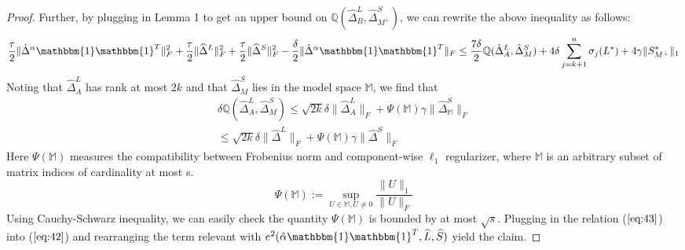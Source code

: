 \documentclass[AMS,STIX1COL]{WileyNJD-v2}
\begin{document}
\begin{proof}
Further, by plugging in Lemma 1 to get an upper bound on  $\mathbb{Q}(\widehat{\Delta}^L_{B},\widehat{\Delta}^S_{M^\perp})$, we can rewrite the above inequality as follows:
\begin{align}
    \frac{\tau}{2} \|\hat{\Delta}^{\alpha}\mathbbm{1}\mathbbm{1}^T\|_{F}^{2} + \frac{\tau}{2} \|\widehat{\Delta}^{L}\|_{F}^{2} + \frac{\tau}{2} \|\widehat{\Delta}^{S}\|_{F}^{2} -
    \frac{\delta}{2} \|\hat{\Delta}^{\alpha}\mathbbm{1}\mathbbm{1}^T\|_{F} 
    \leq 
    \frac{7\delta}{2}\mathbb{Q}(\hat{\Delta}^L_{A},\hat{\Delta}^S_{M}) + 4 \delta \sum_{j=k+1}^{n} \sigma_{j}(L^*) + 4\gamma \|S^*_{M^\perp}\|_{1}  \label{eq:42}
\end{align}
Noting that $\widehat{\Delta}^{L}_{A}$ has rank at most 2$k$ and that $\widehat{\Delta}^{S}_{M}$ lies in the model space $\mathbb{M}$, we find that
\begin{align}
    \nonumber 
    \delta\mathbb{Q}(\widehat{\Delta}^L_{A},\widehat{\Delta}^S_{M}) 
    \leq \sqrt{2k}\delta\|\widehat{\Delta}^L_{A}\|_{F} + \Psi(\mathbb{M})\gamma\|\widehat{\Delta}^S_\mathbb{M}\|_{F}\\
    \leq \sqrt{2k}\delta\|\widehat{\Delta}^L\|_{F} + \Psi(\mathbb{M})\gamma\|\widehat{\Delta}^S\|_{F}  \label{eq:43}
\end{align}
Here $\Psi(\mathbb{M})$ measures the compatibility between Frobenius norm and component-wise $\ell_{1}$ regularizer, where $\mathbb{M}$ is an arbitrary subset of matrix indices of cardinality at most s. 
\[
    \Psi(\mathbb{M}):=\sup\limits_{U\in\mathbb{M},U\neq0}\frac{\|U\|_{1}}{\|U\|_{F}}
\]
Using Cauchy-Schwarz inequality, we can easily check the quantity $\Psi(\mathbb{M})$ is bounded by at most $\sqrt{s}$. Plugging in the relation ($\ref{eq:43}$) into ($\ref{eq:42}$) and rearranging the term relevant with  $e^{2}(\hat{\alpha}\mathbbm{1}\mathbbm{1}^T,\widehat{L},\widehat{S})$ yield the claim.
\end{proof}
\end{document}
